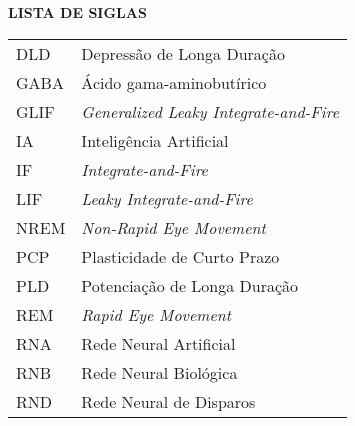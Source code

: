 \begin{center}
\textbf{LISTA DE SIGLAS}
\end{center}
\vspace*{0.5cm}
\begin{tabular}{ll}
DLD & Depressão de Longa Duração \\
GABA & Ácido gama-aminobutírico \\
GLIF & \textit{Generalized Leaky Integrate-and-Fire} \\
IA & Inteligência Artificial \\
IF & \textit{Integrate-and-Fire} \\
LIF & \textit{Leaky Integrate-and-Fire} \\
NREM & \textit{Non-Rapid Eye Movement} \\
PCP & Plasticidade de Curto Prazo \\
PLD & Potenciação de Longa Duração \\
REM & \textit{Rapid Eye Movement} \\
RNA & Rede Neural Artificial \\
RNB & Rede Neural Biológica \\
RND & Rede Neural de Disparos \\
\end{tabular}
\addtocounter{table}{0}